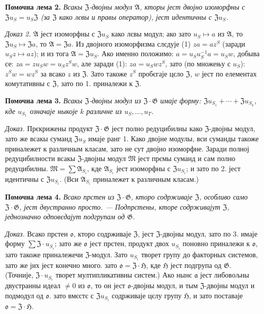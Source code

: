 \documentclass[11pt]{article}
\begin{document}
\noindent\textbf{Помочна лема 2.} \emph{Всакы \(\mathfrak Z\)-двојны модул \(\mathfrak A\), кторы јест двојно изоморфны с \(\mathfrak Zu_S=u_S\mathfrak Z\) (за \(\mathfrak Z\) како лєвы и правы оператор), јест идентичны с \(\mathfrak Zu_S\).}

\noindent\emph{Доказ 2.} \(\mathfrak A\) јест изоморфны с \(\mathfrak Zu_S\) како лєвы модул; ако зато \(u_S\mapsto a\) из \(\mathfrak A\), то \(\mathfrak Zu_S\mapsto\mathfrak Za\), то \(\mathfrak A=\mathfrak Za\). Из двојного изоморфизма слєдује (1) \(za=az^S\) (заради \(u_Sz\mapsto az\)); и из тога \(\mathfrak A=\mathfrak Zu_S\). Ако именно положимо: \(a=u_Su_S^{-1}a=u_Sw\), добыва се: \(za=zu_Sw=u_Sz^Sw\), але заради (1): \(za=u_Swz^S\), зато (по множењу с \(u_S\)): \(z^Sw=wz^S\) за всако \(z\) из \(\mathfrak Z\). Зато такоже \(z^S\) пробєгаје цєло \(\mathfrak Z\), \(w\) јест по елементах комутативны с \(\mathfrak Z\), зато по 1. приналежи к \(\mathfrak Z\).

\noindent\textbf{Помочна лема 3.} \emph{Всакы \(\mathfrak Z\)-двојны модул из \(\mathfrak Z\cdot\mathfrak G\) имаје форму: \(\mathfrak Zu_{S_1}+\cdots+\mathfrak Zu_{S_k}\), кде \(u_{S_1}\) означаје ныкоје \(k\) различне из \(u_S,\ldots,u_T\).}

\noindent\emph{Доказ.} Прєкрижены продукт \(\mathfrak Z\cdot\mathfrak G\) јест полно редуцибилны како \(\mathfrak Z\)-двојны модул, зато же всакы суманд \(\mathfrak Zu_S\) имаје ранг 1. Како двојне модулы, вси суманды такоже приналежет к различным класам, зато не сут двојно изоморфне. Заради полној редуцибилности всакы \(\mathfrak Z\)-двојны модул \(\mathfrak M\) јест прємы суманд и сам полно редуцибилны. \(\mathfrak M=\sum\mathfrak A_{S_i}\), кде \(\mathfrak A_{S_i}\) јест изоморфны с \(\mathfrak Zu_{S_i}\); и зато по 2. јест идентичны с \(\mathfrak Zu_{S_i}\). (Вси \(\mathfrak A_{S_i}\) приналежет к различным класам.)

\noindent\textbf{Помочна лема 4.} \emph{Всако прстен из \(\mathfrak Z\cdot\mathfrak G\), кторо содрживаје \(\mathfrak Z\), особливо само \(\mathfrak Z\cdot\mathfrak G\), јест двустранно просто. --- Подпрстены, кторе содрживајут \(\mathfrak Z\), једнозначно одповєдајут подгрупам од \(\mathfrak G\).}

\noindent\emph{Доказ.} Всако прстен \(\mathfrak o\), кторо содрживаје \(\mathfrak Z\), јест \(\mathfrak Z\)-двојны модул, зато по 3. имаје форму \(\sum\mathfrak Z\cdot u_{S_i}\); зато же \(\mathfrak o\) јест прстен, продукт двох \(u_{S_i}\) поновно приналежи к \(\mathfrak o\), зато такоже приналежечи \(\mathfrak Z\)-модул. Зато \(u_{S_i}\) творет групу до факторных системов, зато же јих јест конечно много. зато \(\mathfrak o=\mathfrak Z\cdot\mathfrak H\), кде \(\mathfrak H\) јест подгрупа од \(\mathfrak G\). (Точније, \(\mathfrak Z\cdot u_{S_i}\) творет мултипликативны систем.) Ако нынє \(\mathfrak a\) јест либовољны двустранны идеал \(\neq0\) из \(\mathfrak o\), то он јест \(\mathfrak o\)-двојны модул, и тым \(\mathfrak Z\)-двојны модул и подмодул од \(\mathfrak o\). зато вмєстє с \(\mathfrak Zu_{S_i}\) содрживаје цєлу групу \(\mathfrak H\), и зато поставаје \(\mathfrak o=\mathfrak Z\cdot\mathfrak H\).
\end{document}
